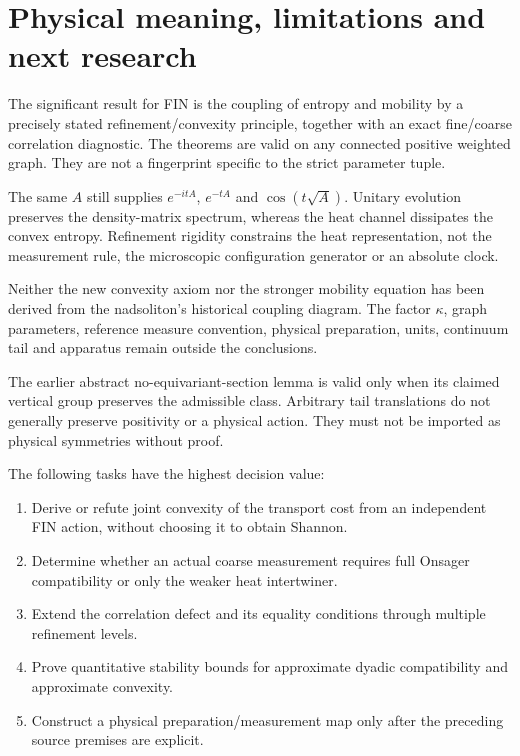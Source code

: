 \documentclass[11pt,a4paper]{article}
\begin{document}
\section{Physical meaning, limitations and next research}

The significant result for FIN is the coupling of entropy and mobility by
a precisely stated refinement/convexity principle, together with an exact
fine/coarse correlation diagnostic. The theorems are valid on any connected
positive weighted graph. They are not a fingerprint specific to the strict
parameter tuple.

The same \(A\) still supplies \(e^{-itA}\), \(e^{-tA}\) and
\(\cos(t\sqrt A)\). Unitary evolution preserves the density-matrix spectrum,
whereas the heat channel dissipates the convex entropy. Refinement rigidity
constrains the heat representation, not the measurement rule, the microscopic
configuration generator or an absolute clock.

Neither the new convexity axiom nor the stronger mobility equation has been
derived from the nadsoliton's historical coupling diagram. The factor
\(\kappa\), graph parameters, reference measure convention, physical preparation,
units, continuum tail and apparatus remain outside the conclusions.

The earlier abstract no-equivariant-section lemma is valid only when its
claimed vertical group preserves the admissible class. Arbitrary tail
translations do not generally preserve positivity or a physical action.
They must not be imported as physical symmetries without proof.

The following tasks have the highest decision value:
\begin{enumerate}
\item Derive or refute joint convexity of the transport cost from an independent
FIN action, without choosing it to obtain Shannon.
\item Determine whether an actual coarse measurement requires full Onsager
compatibility or only the weaker heat intertwiner.
\item Extend the correlation defect and its equality conditions through
multiple refinement levels.
\item Prove quantitative stability bounds for approximate dyadic compatibility
and approximate convexity.
\item Construct a physical preparation/measurement map only after the preceding
source premises are explicit.
\end{enumerate}
\end{document}
